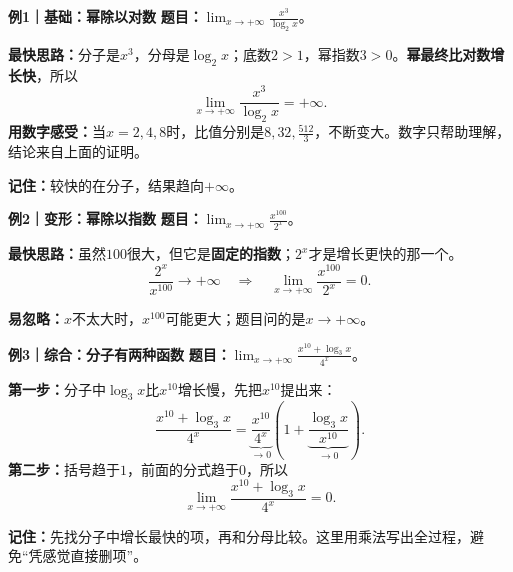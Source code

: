 \begin{examplebox}
	\textbf{\textcolor{CExample}{例1｜基础：幂除以对数}}
	\textbf{题目：}$\displaystyle\lim_{x\to+\infty}\frac{x^3}{\log_2x}$。

	\textbf{最快思路：}分子是$x^3$，分母是$\log_2x$；底数$2>1$，幂指数$3>0$。\textbf{幂最终比对数增长快}，所以
	\[
		\boxed{\lim_{x\to+\infty}\frac{x^3}{\log_2x}=+\infty}.
	\]
	\textbf{用数字感受：}当$x=2,4,8$时，比值分别是$8,32,\frac{512}{3}$，不断变大。数字只帮助理解，结论来自上面的证明。
	\begin{center}
	
	\end{center}
	\textbf{记住：}较快的在分子，结果趋向$+\infty$。

	\medskip
	\textbf{\textcolor{CExample}{例2｜变形：幂除以指数}}
	\textbf{题目：}$\displaystyle\lim_{x\to+\infty}\frac{x^{100}}{2^x}$。

	\textbf{最快思路：}虽然$100$很大，但它是\textbf{固定的指数}；$2^x$才是增长更快的那一个。
	\[
		\frac{2^x}{x^{100}}\to+\infty
		\quad\Longrightarrow\quad
		\boxed{\lim_{x\to+\infty}\frac{x^{100}}{2^x}=0}.
	\]
	\begin{center}
	
	\end{center}
	\textbf{易忽略：}$x$不太大时，$x^{100}$可能更大；题目问的是$x\to+\infty$。

	\medskip
	\textbf{\textcolor{CExample}{例3｜综合：分子有两种函数}}
	\textbf{题目：}$\displaystyle\lim_{x\to+\infty}\frac{x^{10}+\log_3x}{4^x}$。

	\textbf{第一步：}分子中$\log_3x$比$x^{10}$增长慢，先把$x^{10}$提出来：
	\[
		\frac{x^{10}+\log_3x}{4^x}
		=\underbrace{\frac{x^{10}}{4^x}}_{\to0}
		\left(1+\underbrace{\frac{\log_3x}{x^{10}}}_{\to0}\right).
	\]
	\textbf{第二步：}括号趋于$1$，前面的分式趋于$0$，所以
	\[
		\boxed{\lim_{x\to+\infty}\frac{x^{10}+\log_3x}{4^x}=0}.
	\]
	\begin{center}
	
	\end{center}
	\textbf{记住：}先找分子中增长最快的项，再和分母比较。这里用乘法写出全过程，避免“凭感觉直接删项”。
\end{examplebox}
